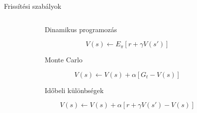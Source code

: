\documentclass[english, aspectratio=169]{beamer}
\begin{document}
\begin{frame}{Frissítési szabályok}
\begin{columns}
\begin{column}{.2\textwidth}
\end{column}
\begin{column}{.6\textwidth}
\begin{block}{\begin{center}Dinamikus programozás\end{center}}
\[
V(s) \leftarrow E_\pi \left[ r + \gamma V(s') \right]
\]
\end{block}
\vspace{0.5cm}
\begin{block}{\begin{center}Monte Carlo\end{center}}
\[
V(s) \leftarrow V(s) + \alpha \left[ G_t - V(s) \right]
\]
\end{block}
\vspace{0.5cm}
\begin{block}{\begin{center}Időbeli különbségek\end{center}}
\[
V(s) \leftarrow V(s) + \alpha \left[ r + \gamma V(s') - V(s) \right]
\]
\end{block}
\end{column}
\begin{column}{.2\textwidth}
\end{column}
\end{columns}
\end{frame}
\end{document}
